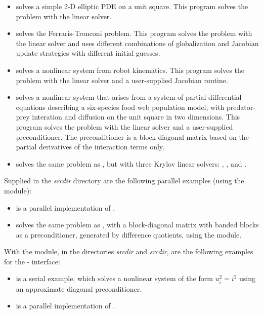 \begin{itemize}
\item {}
  solves a simple 2-D elliptic PDE on a unit square.
 \newline
  This program solves the problem with the {\kinband} linear solver.
\item {}
  solves the Ferraris-Tronconi problem.
  \newline
  This program solves the problem with the {\kindense} linear solver
  and uses different combinations of globalization and Jacobian
  update strategies with different initial guesses.
\item {}
  solves a nonlinear system from robot kinematics.
  \newline
  This program solves the problem with the {\kindense} linear solver
  and a user-supplied Jacobian routine.
\item {}
  solves a nonlinear system that arises from a system of partial
  differential equations describing a six-species food web population
  model, with predator-prey interation and diffusion on the unit
  square in two dimensions.
  \newline
  This program solves the problem with the {\kinspgmr} linear solver
  and a user-supplied preconditioner. The preconditioner is a
  block-diagonal matrix based on the partial derivatives of the
  interaction terms only.
\item {}
  solves the same problem as , but with three Krylov
  linear solvers: , , and .
\end{itemize}

\vspace{0.2in}\noindent
Supplied in the {\em srcdir} directory are
the following parallel examples (using the {\nvecp} module):
\begin{itemize}
\item {}
  is a parallel implementation of .
\item {}
  solves the same problem as , with a block-diagonal matrix
  with banded blocks as a preconditioner, generated by difference quotients,
  using the {\kinbbdpre} module.
\end{itemize}

\vspace{0.2in}\noindent
With the {\fkinsol} module, in the directories 
{\em srcdir} and
{\em srcdir}, are the following examples for
the {\F}-{\C} interface:
\begin{itemize}
\item {}
  is a serial example, which solves a nonlinear system of the form
  $u_i^2 = i^2$ using an approximate diagonal preconditioner.
\item {}
  is a parallel implementation of .
\end{itemize}

